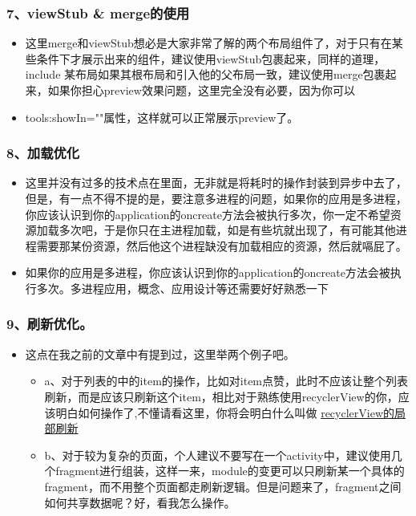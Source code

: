 \documentclass[9pt, b5paper]{article}
\begin{document}
\subsubsection{7、viewStub \& merge的使用}
\label{sec-1-8-7}
\begin{itemize}
\item 这里merge和viewStub想必是大家非常了解的两个布局组件了，对于只有在某些条件下才展示出来的组件，建议使用viewStub包裹起来，同样的道理，include 某布局如果其根布局和引入他的父布局一致，建议使用merge包裹起来，如果你担心preview效果问题，这里完全没有必要，因为你可以
\item tools:showIn=""属性，这样就可以正常展示preview了。
\end{itemize}
\subsubsection{8、加载优化}
\label{sec-1-8-8}
\begin{itemize}
\item 这里并没有过多的技术点在里面，无非就是将耗时的操作封装到异步中去了，但是，有一点不得不提的是，要注意多进程的问题，如果你的应用是多进程，你应该认识到你的application的oncreate方法会被执行多次，你一定不希望资源加载多次吧，于是你只在主进程加载，如是有些坑就出现了，有可能其他进程需要那某份资源，然后他这个进程缺没有加载相应的资源，然后就嗝屁了。
\item 如果你的应用是多进程，你应该认识到你的application的oncreate方法会被执行多次。多进程应用，概念、应用设计等还需要好好熟悉一下
\end{itemize}
\subsubsection{9、刷新优化。}
\label{sec-1-8-9}
\begin{itemize}
\item 这点在我之前的文章中有提到过，这里举两个例子吧。
\begin{itemize}
\item a、对于列表的中的item的操作，比如对item点赞，此时不应该让整个列表刷新，而是应该只刷新这个item，相比对于熟练使用recyclerView的你，应该明白如何操作了,不懂请看这里，你将会明白什么叫做 \uline{recyclerView的局部刷新}
\item b、对于较为复杂的页面，个人建议不要写在一个activity中，建议使用几个fragment进行组装，这样一来，module的变更可以只刷新某一个具体的fragment，而不用整个页面都走刷新逻辑。但是问题来了，fragment之间如何共享数据呢？好，看我怎么操作。
\end{itemize}
\end{itemize}
\end{document}
